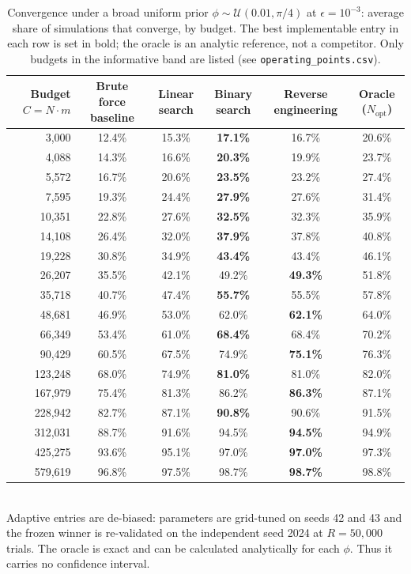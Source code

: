 \begin{table}[ht]
\centering
\small
\caption{Convergence under a broad uniform prior $\phi\sim\mathcal{U}(0.01,\pi/4)$ at $\epsilon=10^{-3}$: average share of simulations that converge, by budget. The best implementable entry in each row is set in bold; the oracle is an analytic reference, not a competitor. Only budgets in the informative band are listed (see \texttt{operating\_points.csv}).}
\label{tab:broad-pi4}
\begin{tabular}{rccccc}
\toprule
Budget $C=N\cdot m$
& Brute force baseline
& Linear search
& Binary search
& Reverse engineering
& Oracle ($N_\text{opt}$) \\
\midrule
3{,}000
& 12.4\%
& 15.3\%
& \textbf{17.1\%}
& 16.7\%
& 20.6\% \\
4{,}088
& 14.3\%
& 16.6\%
& \textbf{20.3\%}
& 19.9\%
& 23.7\% \\
5{,}572
& 16.7\%
& 20.6\%
& \textbf{23.5\%}
& 23.2\%
& 27.4\% \\
7{,}595
& 19.3\%
& 24.4\%
& \textbf{27.9\%}
& 27.6\%
& 31.4\% \\
10{,}351
& 22.8\%
& 27.6\%
& \textbf{32.5\%}
& 32.3\%
& 35.9\% \\
14{,}108
& 26.4\%
& 32.0\%
& \textbf{37.9\%}
& 37.8\%
& 40.8\% \\
19{,}228
& 30.8\%
& 34.9\%
& \textbf{43.4\%}
& 43.4\%
& 46.1\% \\
26{,}207
& 35.5\%
& 42.1\%
& 49.2\%
& \textbf{49.3\%}
& 51.8\% \\
35{,}718
& 40.7\%
& 47.4\%
& \textbf{55.7\%}
& 55.5\%
& 57.8\% \\
48{,}681
& 46.9\%
& 53.0\%
& 62.0\%
& \textbf{62.1\%}
& 64.0\% \\
66{,}349
& 53.4\%
& 61.0\%
& \textbf{68.4\%}
& 68.4\%
& 70.2\% \\
90{,}429
& 60.5\%
& 67.5\%
& 74.9\%
& \textbf{75.1\%}
& 76.3\% \\
123{,}248
& 68.0\%
& 74.9\%
& \textbf{81.0\%}
& 81.0\%
& 82.0\% \\
167{,}979
& 75.4\%
& 81.3\%
& 86.2\%
& \textbf{86.3\%}
& 87.1\% \\
228{,}942
& 82.7\%
& 87.1\%
& \textbf{90.8\%}
& 90.6\%
& 91.5\% \\
312{,}031
& 88.7\%
& 91.6\%
& 94.5\%
& \textbf{94.5\%}
& 94.9\% \\
425{,}275
& 93.6\%
& 95.1\%
& 97.0\%
& \textbf{97.0\%}
& 97.3\% \\
579{,}619
& 96.8\%
& 97.5\%
& 98.7\%
& \textbf{98.7\%}
& 98.8\% \\
\bottomrule
\end{tabular}
\\[2pt]
\footnotesize Adaptive entries are de-biased: parameters are grid-tuned on seeds 42 and 43 and the frozen winner is re-validated on the independent seed 2024 at $R=50{,}000$ trials. The oracle is exact and can be calculated analytically for each $\phi$. Thus it carries no confidence interval.
\end{table}

